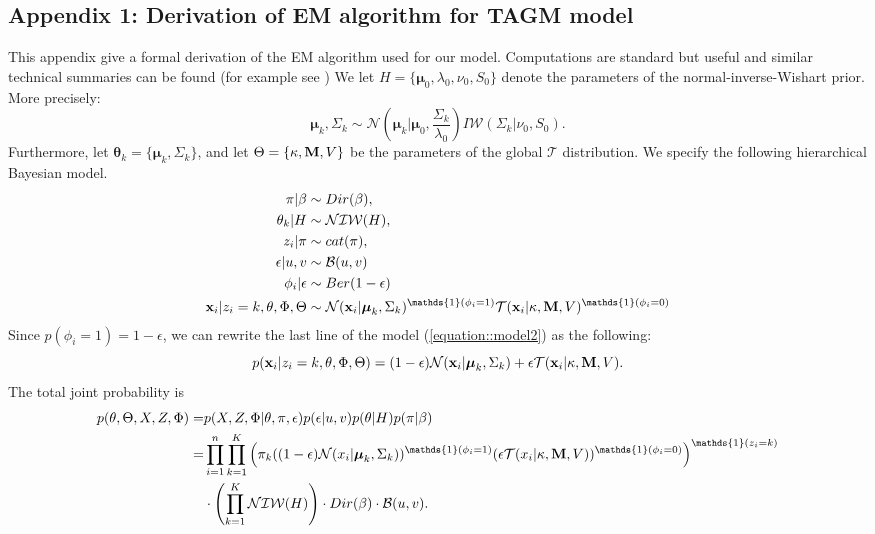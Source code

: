 \documentclass[12pt,english]{article}\usepackage[]{graphicx}\usepackage[]{color}
\begin{document}
\subsection{Appendix 1: Derivation of EM algorithm for TAGM model}\label{apd:EMderv}
This appendix give a formal derivation of the EM algorithm used for our model. Computations are standard but useful and similar
technical summaries can be found (for example see \cite{Fraley:2005, Murphy:2007})
We let $H = \{\boldsymbol{\mu}_0, \lambda_0, \nu_0, S_0\}$ denote the parameters of the normal-inverse-Wishart prior. More precisely:
\begin{equation} \label{equation::prior}
\boldsymbol{\mu}_k, \Sigma_k\sim \mathcal{N}\left(\boldsymbol{\mu}_k|\boldsymbol{\mu}_0, \frac{\Sigma_{k}}{\lambda_0}\right)I\mathcal{W}\left(\Sigma_{k}|\nu_0, S_0\right).
\end{equation}
Furthermore, let $\boldsymbol{\theta}_k = \{\boldsymbol{\mu}_k, \Sigma_{k}\}$, and let $\Theta = \{\kappa, {\bf M},V\}$ be the parameters of the global $\mathcal{T}$ distribution. We specify the following hierarchical Bayesian model.
\begin{equation}\label{equation::model2}
\begin{split}
\pi|\beta &\sim Dir(\beta),\\
\theta_k|H &\sim \mathcal{NIW}(H),\\
z_i|\pi & \sim cat(\pi), \\
\epsilon|u,v & \sim \mathcal{B}(u,v)  \\
\phi_i|\epsilon & \sim Ber(1-\epsilon) \\
{\bf x}_i|z_i = k,\theta, \Phi , \Theta & \sim \mathcal{N}({\bf x}_i|\boldsymbol{\mu}_k, \Sigma_k)^{\mathds{1}(\phi_i = 1)}\mathcal{T}({\bf x}_i|\kappa, {\bf M}, V)^{\mathds{1}(\phi_i = 0)}
\end{split}
\end{equation}
Since $p(\phi_i = 1) = 1-\epsilon$, we can rewrite the last line of the model (\ref{equation::model2}) as the following:
\[p({\bf x}_i|z_i = k,\theta, \Phi , \Theta) = (1-\epsilon) \mathcal{N}({\bf x}_i|\boldsymbol{\mu}_k, \Sigma_k) + \epsilon \mathcal{T}({\bf x}_i|\kappa, {\bf M}, V).\]
The total joint probability is
\begin{equation}\label{equation::likelihood2}
\begin{split}
p(\theta,\Theta, X, Z, \Phi)  = &p(X,Z,\Phi|\theta,\pi, \epsilon)p(\epsilon|u,v)p(\theta|H)p(\pi|\beta)\\
=  & \prod_{i=1}^{n}\prod_{k=1}^{K}\left(\pi_k((1-\epsilon)\mathcal{N}(x_i|\boldsymbol{\mu}_k, \Sigma_k))^{\mathds{1}(\phi_i = 1)}(\epsilon \mathcal{T}(x_i|\kappa, {\bf M}, V))^{\mathds{1}(\phi_i = 0)}\right)^{\mathds{1}(z_i=k)}\\
&\cdot \left(\prod_{k=1}^{K}\mathcal{NIW}(H)\right)\cdot Dir(\beta)\cdot \mathcal{B}(u,v).
\end{split}
\end{equation}
\end{document}
